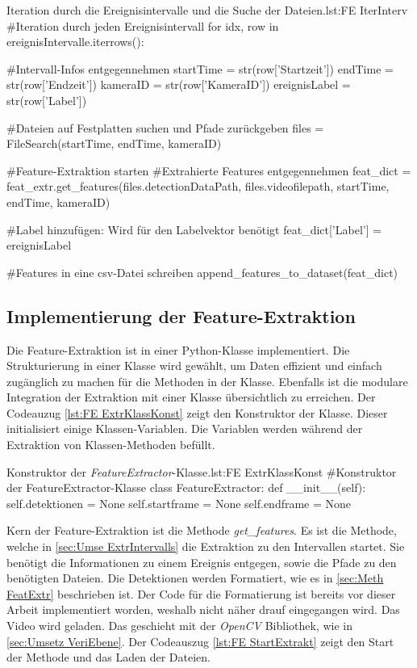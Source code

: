 \begin{pythoncode}{Iteration durch die Ereignisintervalle und die Suche der Dateien.}{lst:FE IterInterv}
#Iteration durch jeden Ereignisintervall
for idx, row in ereignisIntervalle.iterrows():

    #Intervall-Infos entgegennehmen
    startTime = str(row['Startzeit'])
    endTime = str(row['Endzeit'])
    kameraID = str(row['KameraID'])
    ereignisLabel = str(row['Label'])

    #Dateien auf Festplatten suchen und Pfade zurückgeben 
    files = FileSearch(startTime, endTime, kameraID)

    #Feature-Extraktion starten
    #Extrahierte Features entgegennehmen
    feat_dict = feat_extr.get_features(files.detectionDataPath, 
                                       files.videofilepath, 
                                       startTime, 
                                       endTime, 
                                       kameraID)

    #Label hinzufügen: Wird für den Labelvektor benötigt
    feat_dict['Label'] = ereignisLabel
    
    #Features in eine csv-Datei schreiben
    append_features_to_dataset(feat_dict)
\end{pythoncode}



\subsection{Implementierung der Feature-Extraktion} \label{sec:Umsets FeatExtrKlass}
Die Feature-Extraktion ist in einer Python-Klasse implementiert. Die Strukturierung in einer Klasse wird gewählt, um Daten effizient und einfach zugänglich zu machen für die Methoden in der Klasse. Ebenfalls ist die modulare Integration der Extraktion mit einer Klasse übersichtlich zu erreichen. Der Codeauzug \ref{lst:FE ExtrKlassKonst} zeigt den Konstruktor der Klasse. Dieser initialisiert einige Klassen-Variablen. Die Variablen werden während der Extraktion von Klassen-Methoden befüllt. 

\begin{pythoncode}{Konstruktor der \textit{FeatureExtractor}-Klasse.}{lst:FE ExtrKlassKonst}
#Konstruktor der FeatureExtractor-Klasse
class FeatureExtractor:
    def __init__(self):
        self.detektionen = None
        self.startframe = None
        self.endframe = None
\end{pythoncode}

Kern der Feature-Extraktion ist die Methode \textit{get\_features}. Es ist die Methode, welche in \ref{sec:Umse ExtrIntervalls} die Extraktion zu den Intervallen startet. Sie benötigt die Informationen zu einem Ereignis entgegen, sowie die Pfade zu den benötigten Dateien. Die Detektionen werden Formatiert, wie es in \ref{sec:Meth FeatExtr} beschrieben ist. Der Code für die Formatierung ist bereits vor dieser Arbeit implementiert worden, weshalb nicht näher drauf eingegangen wird. Das Video wird geladen. Das geschieht mit der \textit{OpenCV} Bibliothek, wie in \ref{sec:Umsetz VeriEbene}. Der Codeauszug \ref{lst:FE StartExtrakt} zeigt den Start der Methode und das Laden der Dateien.

